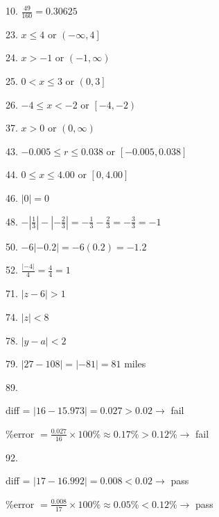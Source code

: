 \documentclass[letterpaper]{article}
\begin{document}
\bigskip

10. $\frac{49}{160} = 0.30625$

\bigskip

23. $x \le 4$ or $\left( -\infty, 4 \right]$

\bigskip

24. $x > -1$ or $\left( -1, \infty \right)$

\bigskip

25. $0 < x \le 3$ or $\left( 0, 3 \right]$

\bigskip

26. $-4 \le x < -2$ or $\left[ -4, -2 \right)$

\bigskip

37. $x > 0$ or $\left( 0, \infty \right)$

\bigskip

43. $-0.005 \le r \le 0.038$ or $\left[ -0.005, 0.038 \right]$

\bigskip

44. $0 \le x \le 4.00$ or $\left[ 0, 4.00 \right]$

\bigskip

46. $|0| = 0$

\bigskip

48.
$-|\frac{1}{3}| - |-\frac{2}{3}|
  = -\frac{1}{3} - \frac{2}{3}
  = -\frac{3}{3}
  = -1$

\bigskip

50. $-6 |-0.2| = -6(0.2) = -1.2$

\bigskip

52. $\frac{|-4|}{4} = \frac{4}{4} = 1$

\bigskip

71. $|z - 6| > 1$

\bigskip

74. $|z| < 8$

\bigskip

78. $|y - a| < 2$

\bigskip

79. $|27 - 108| = |-81| = 81$ miles

\bigskip

89.

\bigskip

diff = $|16 - 15.973| = 0.027 > 0.02 \to$ fail

\%error $ = \frac{0.027}{16} \times 100\% \approx 0.17\% > 0.12\% \to$ fail

\bigskip

92.

\bigskip

diff = $|17 - 16.992| = 0.008 < 0.02 \to$ pass

\%error $ = \frac{0.008}{17} \times 100\% \approx 0.05\% < 0.12\% \to$ pass
\end{document}
